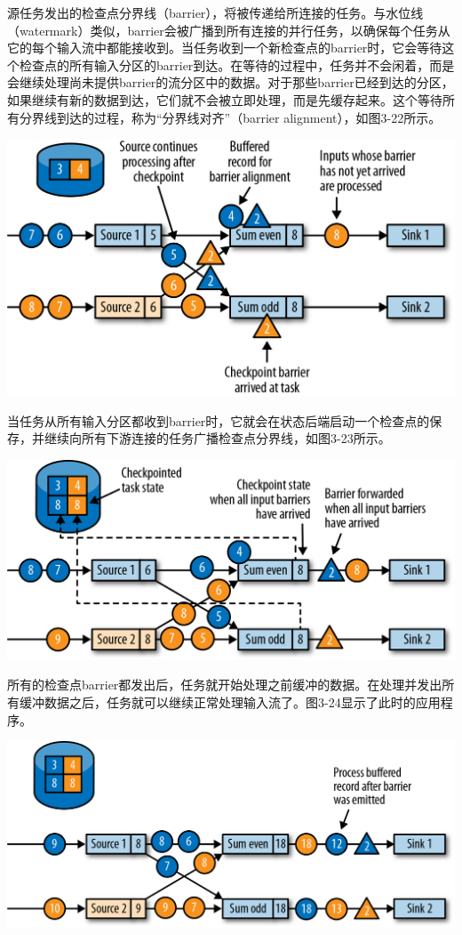 \documentclass[oneside]{ctexbook}
\begin{document}
源任务发出的检查点分界线（barrier），将被传递给所连接的任务。与水位线（watermark）类似，barrier会被广播到所有连接的并行任务，以确保每个任务从它的每个输入流中都能接收到。当任务收到一个新检查点的barrier时，它会等待这个检查点的所有输入分区的barrier到达。在等待的过程中，任务并不会闲着，而是会继续处理尚未提供barrier的流分区中的数据。对于那些barrier已经到达的分区，如果继续有新的数据到达，它们就不会被立即处理，而是先缓存起来。这个等待所有分界线到达的过程，称为“分界线对齐”（barrier alignment），如图3-22所示。

\noindent \includegraphics[width=\textwidth]{spaf_0322.png}

当任务从所有输入分区都收到barrier时，它就会在状态后端启动一个检查点的保存，并继续向所有下游连接的任务广播检查点分界线，如图3-23所示。

\noindent \includegraphics[width=\textwidth]{spaf_0323.png}

所有的检查点barrier都发出后，任务就开始处理之前缓冲的数据。在处理并发出所有缓冲数据之后，任务就可以继续正常处理输入流了。图3-24显示了此时的应用程序。

\noindent \includegraphics[width=\textwidth]{spaf_0324.png}
\end{document}
